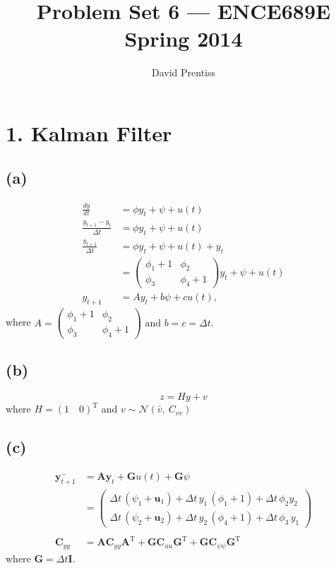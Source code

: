 \documentclass[fleqn, letterpaper]{tufte-handout}
\title{Problem Set 6 --- ENCE689E Spring 2014}
\author{David Prentiss}
\newcommand{\T}{^\text{T}}
\newcommand{\y}{\mathbf{y}}
\newcommand{\A}{\mathbf{A}}
\newcommand{\GG}{\mathbf{G}}
\newcommand{\uu}{\mathbf{u}}
\newcommand{\cyy}{\mathbf{C}_{yy}}
\newcommand{\cuu}{\mathbf{C}_{uu}}
\newcommand{\cpp}{\mathbf{C}_{\psi\psi}}
\begin{document}
\maketitle

\section{1. Kalman Filter}
\subsection{(a)}
\begin{align*}
        \frac{dy}{dt} &= \phi y_t + \psi + u(t) \\
        \frac{y_{t+1}-y_t}{\Delta t} &= \phi y_t + \psi + u(t) \\
        \frac{y_{t+1}}{\Delta t} &= \phi y_t + \psi + u(t) + y_t\\
                                 &= \begin{pmatrix} \phi_1+1 & \phi_2 \\ \phi_3 &\phi_4+1\end{pmatrix} y_t + \psi + u(t)\\
        y_{t+1} &= Ay_t + b\psi + cu(t),
\end{align*}
where $A = \begin{pmatrix} \phi_1+1 & \phi_2 \\ \phi_3 &\phi_4+1\end{pmatrix}\text{ and } b = c = \Delta t
$.

\subsection{(b)}
\[z = Hy + v\]
where $ H = (1\quad 0)\T $ and $v\sim\mathcal{N}(\bar{v},\ C_{vv})$

\subsection{(c)}
\begin{align*}
\y_{t+1}^- &= \A\y_t + \GG u(t) + \GG\psi\\
&= \left(\begin{array}{c} \Delta t\, \left(\psi_1+ \uu_1\right) + \Delta t\, y_1\, \left(\phi_1 + 1\right) + \Delta t\, \phi_2 y_2\\ \Delta t\, \left(\psi_2 + \uu_2\right) + \Delta t\, y_2\, \left(\phi_4 + 1\right) + \Delta t\, \phi_3\, y_1 \end{array}\right) \\ \\
\cyy &= \A\cyy\A\T + \GG\cuu\GG\T + \GG\cpp\GG\T
\end{align*}
where $\GG = \Delta t \mathbf{I}$.
\end{document}
